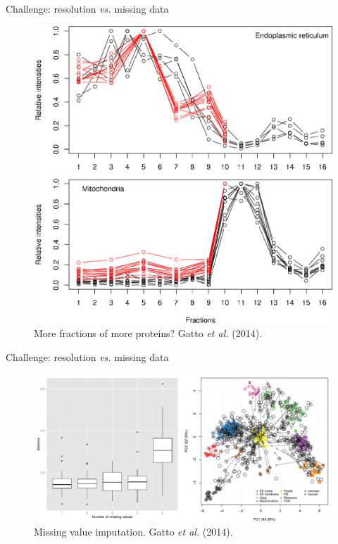 \documentclass[presentation]{beamer}
\begin{document}
\begin{frame}{Challenge: resolution \textit{vs.} missing data}
  \begin{figure}[h]
    \centering
    \includegraphics[width=.65\linewidth]{./figures/fractions.eps}
    \caption{More fractions of more proteins? Gatto \textit{et al.} (2014).}
  \end{figure}
\end{frame}

\begin{frame}{Challenge: resolution \textit{vs.} missing data}
  \begin{figure}[h]
    \centering
    \includegraphics[width=.7\linewidth]{./figures/impute.pdf}
    \caption{Missing value imputation. Gatto \textit{et al.} (2014).}
  \end{figure}
\end{frame}
\end{document}
